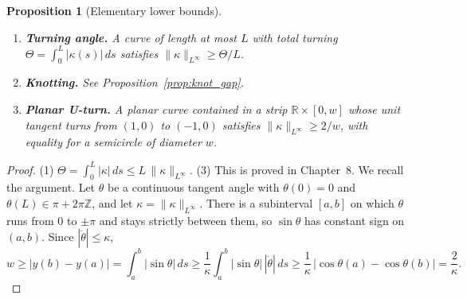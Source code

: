 \documentclass[11pt,reqno]{amsart}
\newtheorem{proposition}[theorem]{Proposition}
\theoremstyle{definition}
\providecommand{\R}{\mathbb{R}}
\numberwithin{equation}{section}
\providecommand{\R}{\mathbb{R}}
\begin{document}
\begin{proposition}[Elementary lower bounds]
\label{thm:lower_bounds}
\leavevmode
\begin{enumerate}
    \item \textbf{Turning angle.} A curve of length at most $L$ with total turning $\Theta = \int_0^L |\kappa(s)|\,ds$ satisfies $\|\kappa\|_{L^\infty} \ge \Theta/L$.
    \item \textbf{Knotting.} See Proposition~\ref{prop:knot_gap}.
    \item \textbf{Planar U-turn.} A planar curve contained in a strip $\R \times [0,w]$ whose unit tangent turns from $(1,0)$ to $(-1,0)$ satisfies $\|\kappa\|_{L^\infty} \ge 2/w$, with equality for a semicircle of diameter $w$.
\end{enumerate}
\end{proposition}

\begin{proof}
(1) $\Theta = \int_0^L |\kappa|\,ds \le L\,\|\kappa\|_{L^\infty}$.
(3) This is proved in Chapter~8. We recall the argument. Let $\theta$ be a continuous tangent angle with $\theta(0) = 0$ and $\theta(L) \in \pi + 2\pi\mathbb{Z}$, and let $\kappa = \|\kappa\|_{L^\infty}$. There is a subinterval $[a,b]$ on which $\theta$ runs from $0$ to $\pm\pi$ and stays strictly between them, so $\sin\theta$ has constant sign on $(a,b)$. Since $|\dot\theta| \le \kappa$,
\begin{equation}
w \ge |y(b) - y(a)| = \int_a^b |\sin\theta|\,ds \ge \frac{1}{\kappa}\int_a^b |\sin\theta|\,|\dot\theta|\,ds \ge \frac{1}{\kappa}\,|\cos\theta(a) - \cos\theta(b)| = \frac{2}{\kappa}.
\end{equation}
\end{proof}
\end{document}
